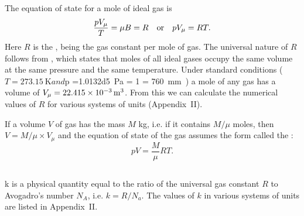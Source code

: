 \subsection{}\label{8.4.4} The equation of state for a mole of ideal gas is
\begin{equation*}%
\frac{pV_{\mu}}{T} = \mu B = R \qor pV_{\mu} = RT.
\end{equation*}
Here $R$ is the , being the gas constant per mole of gas. The universal nature of $R$ follows from , which states that moles of all ideal gases occupy the same volume at the same pressure and the same tempera­ture. Under standard conditions ($T = \SI{273.15}{\kelvin} and $p =\SI{1.0132d5}{\pascal} = \SI{1}{\atmos} = \SI{760}{\milli\meter\mercury}) a mole of any gas has a volume of $V_{\mu} = \SI{22.415d-3}{\meter\cubed}$. From this we can calculate the numerical values of $R$ for various systems of units (Appendix~II).

If a volume $V$ of gas has the mass $M$ \si{\kilo\gram}, i.e. if it contains $M/\mu$ moles, then $V = M /\mu \times V_{\mu}$ and the equation of state of the gas assumes the form called the :
\begin{equation*}%
pV = \frac{M}{\mu} RT.
\end{equation*}

\subsection{}\label{8.4.5}  k is a physical quantity equal to the ratio of the universal gas constant $R$ to Avogadro's number $N_{A}$, i.e. $k = R/N_{a}$. The values of $k$ in various systems of units are listed in Appendix~II.

